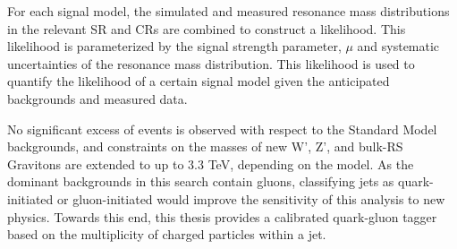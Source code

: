 For each signal model, the simulated and measured resonance mass distributions in the relevant SR and CRs are combined to construct a likelihood. This likelihood is parameterized by the signal strength parameter, $\mu$ and systematic uncertainties of the resonance mass distribution. This likelihood is used to quantify the likelihood of a certain signal model given the anticipated backgrounds and measured data.

No significant excess of events is observed with respect to the Standard Model backgrounds, and constraints on the masses of new W', Z', and bulk-RS Gravitons are extended to up to 3.3 TeV, depending on the model. As the dominant backgrounds in this search contain gluons, classifying jets as quark-initiated or gluon-initiated would improve the sensitivity of this analysis to new physics. Towards this end, this thesis provides a calibrated quark-gluon tagger based on the multiplicity of charged particles within a jet.